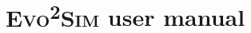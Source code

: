 \documentclass[a4paper,12pt,onecolumn]{template}
\newcommand{\EvoEvoSim}{\textsc{Evo\textsuperscript{2}Sim}}
\begin{document}




 


\appendix

\chapter{{\EvoEvoSim} user manual}
\label{ch:appendix:user_manual}
\clearemptydoublepage



\end{document}
